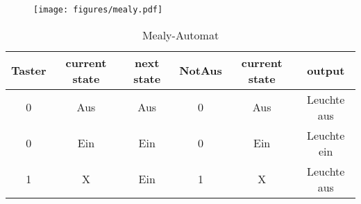 \documentclass[12pt,a4paper,ngerman]{article}
\begin{document}
\begin{figure}[h!]
\centering
\texttt{[image: figures/mealy.pdf]} 
\end{figure}
\begin{table}[h!]
  \begin{center}
    \begin{tabular}{| c | c | c ||| c | c | c |}
    \hline
    Taster  &  current state & next state & NotAus & current state & output  \\ \hline \hline
    0  & Aus & Aus & 0 & Aus & Leuchte aus \\ \hline
    0 & Ein & Ein  & 0 & Ein & Leuchte ein\\ \hline
    1  & X  & Ein & 1 & X & Leuchte aus \\ \hline
    \end{tabular}
  \end{center}
  \caption{Mealy-Automat}
\end{table}
\pagebreak
\end{document}
